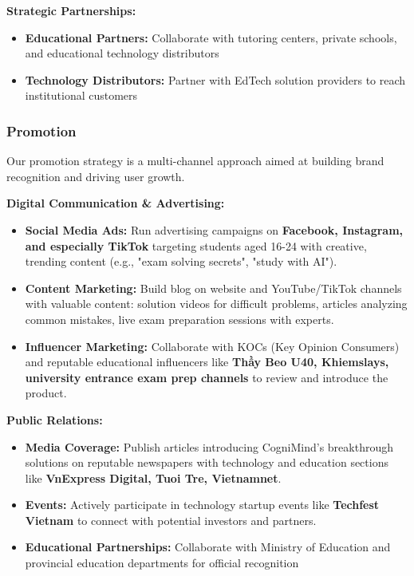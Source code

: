 \textbf{Strategic Partnerships:}
\begin{itemize}
    \item \textbf{Educational Partners:}
        Collaborate with tutoring centers, private schools, and educational technology distributors
    \item \textbf{Technology Distributors:}
        Partner with EdTech solution providers to reach institutional customers
\end{itemize}

\subsubsection{Promotion}
Our promotion strategy is a multi-channel approach aimed at building brand recognition and driving user growth.

\textbf{Digital Communication \& Advertising:}
\begin{itemize}
    \item \textbf{Social Media Ads:}
        Run advertising campaigns on \textbf{Facebook, Instagram, and especially TikTok} targeting students aged 16-24
        with creative, trending content (e.g., "exam solving secrets", "study with AI").
    \item \textbf{Content Marketing:}
        Build blog on website and YouTube/TikTok channels with valuable content: solution videos for difficult problems,
        articles analyzing common mistakes, live exam preparation sessions with experts.
    \item \textbf{Influencer Marketing:}    
        Collaborate with KOCs (Key Opinion Consumers) and reputable educational influencers like 
        \textbf{Thầy Beo U40, Khiemslays, university entrance exam prep channels} to review and introduce the product.
\end{itemize}

\textbf{Public Relations:}
\begin{itemize}
    \item \textbf{Media Coverage:}
        Publish articles introducing CogniMind's breakthrough solutions on reputable newspapers with technology and
        education sections like \textbf{VnExpress Digital, Tuoi Tre, Vietnamnet}.
    \item \textbf{Events:}
        Actively participate in technology startup events like \textbf{Techfest Vietnam} to connect with potential
        investors and partners.
    \item \textbf{Educational Partnerships:} Collaborate with Ministry of Education and provincial education departments for official recognition
\end{itemize}

